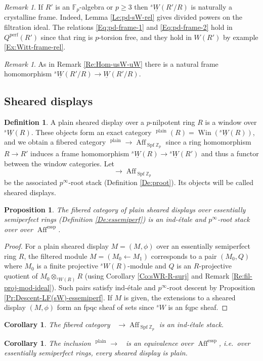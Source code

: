 \documentclass[a4paper,11pt]{amsart}
\theoremstyle{plain}
\newtheorem{Prop}[equation]{Proposition}
\newtheorem{Cor}[equation]{Corollary}
\theoremstyle{definition}
\newtheorem{Defn}[equation]{Definition}
\theoremstyle{remark}
\newtheorem{Remark}[equation]{Remark}
\newcommand{\bPr}{\begin{Prop}}
\newcommand{\ePr}{\end{Prop}}
\newcommand{\bCo}{\begin{Cor}}
\newcommand{\eCo}{\end{Cor}}
\newcommand{\bDe}{\begin{Defn}}
\newcommand{\eDe}{\end{Defn}}
\newcommand{\bRe}{\begin{Remark}}
\newcommand{\eRe}{\end{Remark}}
\newcommand{\bproof}{\begin{proof}}
\newcommand{\eproof}{\end{proof}}
\renewcommand{\u}{\underline}
\newcommand{\uM}{M} %
\numberwithin{equation}{section}
\newcommand{\FF}{{\mathbb{F}}}
\newcommand{\ZZ}{{\mathbb{Z}}}
\DeclareMathOperator{\essemiperf}{essp}
\DeclareMathOperator{\plain}{plain}
\DeclareMathOperator{\perf}{perf}
\DeclareMathOperator{\Aff}{Aff}
\DeclareMathOperator{\sDisp}{{}^sDisp}
\DeclareMathOperator{\Spf}{Spf}
\DeclareMathOperator{\Win}{Win}
\newcommand{\limperf}{^{\perf}}
\newcommand{\sW}{{}^sW}
\newcommand{\usW}{{}^s\u W}
\begin{document}
\bRe
\label{Re:usW-rel-pd-frame}
If $R'$ is an $\FF_p$-algebra or $p\ge 3$ then $\usW(R'/R)$ 
is naturally a crystalline frame. Indeed, Lemma \ref{Le:pd-sW-rel} gives divided powers on the filtration ideal. The relations \eqref{Eq:pd-frame-1} and \eqref{Eq:pd-frame-2} hold in $Q\limperf(R')$ since that ring is $p$-torsion free, and they hold in $W(R')$ by example \ref{Ex:Witt-frame-rel}.
\eRe

\bRe
\label{Re:Hom-usW-uW-rel}
As in Remark \ref{Re:Hom-usW-uW} there is a natural frame homomorphism $\usW(R'/R)\to\u W(R'/R)$.
\eRe

\subsection{Sheared displays}

\bDe
\label{De:Sh-disp}
A plain sheared display over a $p$-nilpotent ring $R$ is a window over $\usW(R)$. 
These objects form an exact category 
$\sDisp^{\plain}(R)=\Win(\usW(R))$,
and we obtain a fibered category
$\sDisp^{\plain}\to\Aff_{\Spf\ZZ_p}$
since a ring homomorphism $R\to R'$ induces a frame homomorphism $\usW(R)\to\usW(R')$ and thus a functor between the window categories. Let
\[
\sDisp\to\Aff_{\Spf\ZZ_p}
\]
be the associated $p^\infty$-root stack (Definition \ref{De:proot}).
Its objects will be called sheared displays.
\eDe

\bPr
\label{Pr:Descent-Sh-disp-essp}
The fibered category of plain sheared displays over essentially semiperfect rings (Definition \ref{De:essemiperf}) is an ind-\'etale and $p^{\infty}$-root stack over over $\Aff^{\essemiperf}$.
\ePr

\bproof
For a plain sheared display $\uM=(M,\phi)$ over an essentially semiperfect ring $R$, the filtered module $M=(M_0\leftarrow M_1)$ corresponds to a pair $(M_0,Q)$ where $M_0$ is a finite projective $\sW(R)$-module and $Q$ is an $R$-projective quotient of $M_0\otimes_{\sW(R)}R$ (using Corollary \ref{Co:sWR-R-surj} and Remark \ref{Re:fil-proj-mod-ideal}). Such pairs satisfy ind-\'etale and $p^\infty$-root descent by Proposition \ref{Pr:Descent-LF(sW)-essemiperf}. If $M$ is given, the extensions to a sheared display $(M,\phi)$ form an fpqc sheaf of sets since $\sW$ is an fqpc sheaf.
\eproof

\bCo
\label{Co:sDissp-ind-etale}
The fibered category $\sDisp\to\Aff_{\Spf\ZZ_p}$ is an ind-\'etale stack.
\eCo

\bCo
\label{Co:essemiperf-plain}
The inclusion $\sDisp^{\plain}\to\sDisp$ is an equivalence over $\Aff^{\essemiperf}$, i.e.\ over essentially semiperfect rings, every sheared display is plain.
\eCo
\end{document}
